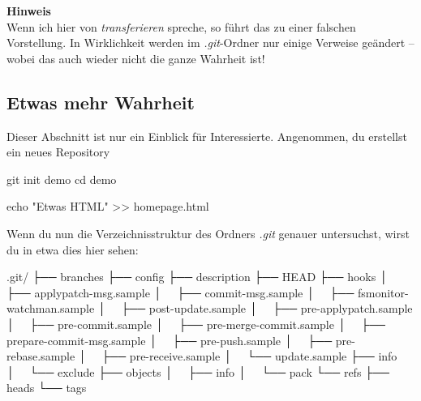\documentclass[
  letterpaper,
  DIV=11]{scrreprt}
\newenvironment{Shaded}{\begin{snugshade}}{\end{snugshade}}
\newcommand{\BuiltInTok}[1]{\textcolor[rgb]{0.00,0.23,0.31}{#1}}
\newcommand{\ExtensionTok}[1]{\textcolor[rgb]{0.00,0.23,0.31}{#1}}
\newcommand{\FunctionTok}[1]{\textcolor[rgb]{0.28,0.35,0.67}{#1}}
\newcommand{\NormalTok}[1]{\textcolor[rgb]{0.00,0.23,0.31}{#1}}
\newcommand{\OperatorTok}[1]{\textcolor[rgb]{0.37,0.37,0.37}{#1}}
\newcommand{\StringTok}[1]{\textcolor[rgb]{0.13,0.47,0.30}{#1}}
\begin{document}
\samplestart

\textbf{Hinweis}\\
Wenn ich hier von \emph{transferieren} spreche, so führt das zu einer
falschen Vorstellung. In Wirklichkeit werden im \emph{.git}-Ordner nur
einige Verweise geändert -- wobei das auch wieder nicht die ganze
Wahrheit ist! \sampleend

\subsection{Etwas mehr Wahrheit}\label{etwas-mehr-wahrheit}

Dieser Abschnitt ist nur ein Einblick für Interessierte. Angenommen, du
erstellst ein neues Repository

\begin{Shaded}
\begin{Highlighting}[]
\FunctionTok{git}\NormalTok{ init demo }
\BuiltInTok{cd}\NormalTok{ demo}

\BuiltInTok{echo} \StringTok{"Etwas HTML"} \OperatorTok{\textgreater{}\textgreater{}}\NormalTok{ homepage.html}
\end{Highlighting}
\end{Shaded}

Wenn du nun die Verzeichnisstruktur des Ordners \emph{.git} genauer
untersuchst, wirst du in etwa dies hier sehen:

\begin{Shaded}
\begin{Highlighting}[]
\ExtensionTok{.git/}
\ExtensionTok{├──}\NormalTok{ branches}
\ExtensionTok{├──}\NormalTok{ config}
\ExtensionTok{├──}\NormalTok{ description}
\ExtensionTok{├──}\NormalTok{ HEAD}
\ExtensionTok{├──}\NormalTok{ hooks}
\ExtensionTok{│  }\NormalTok{ ├── applypatch{-}msg.sample}
\ExtensionTok{│  }\NormalTok{ ├── commit{-}msg.sample}
\ExtensionTok{│  }\NormalTok{ ├── fsmonitor{-}watchman.sample}
\ExtensionTok{│  }\NormalTok{ ├── post{-}update.sample}
\ExtensionTok{│  }\NormalTok{ ├── pre{-}applypatch.sample}
\ExtensionTok{│  }\NormalTok{ ├── pre{-}commit.sample}
\ExtensionTok{│  }\NormalTok{ ├── pre{-}merge{-}commit.sample}
\ExtensionTok{│  }\NormalTok{ ├── prepare{-}commit{-}msg.sample}
\ExtensionTok{│  }\NormalTok{ ├── pre{-}push.sample}
\ExtensionTok{│  }\NormalTok{ ├── pre{-}rebase.sample}
\ExtensionTok{│  }\NormalTok{ ├── pre{-}receive.sample}
\ExtensionTok{│  }\NormalTok{ └── update.sample}
\ExtensionTok{├──}\NormalTok{ info}
\ExtensionTok{│  }\NormalTok{ └── exclude}
\ExtensionTok{├──}\NormalTok{ objects}
\ExtensionTok{│  }\NormalTok{ ├── info}
\ExtensionTok{│  }\NormalTok{ └── pack}
\ExtensionTok{└──}\NormalTok{ refs}
    \ExtensionTok{├──}\NormalTok{ heads}
    \ExtensionTok{└──}\NormalTok{ tags}
\end{Highlighting}
\end{Shaded}
\end{document}
